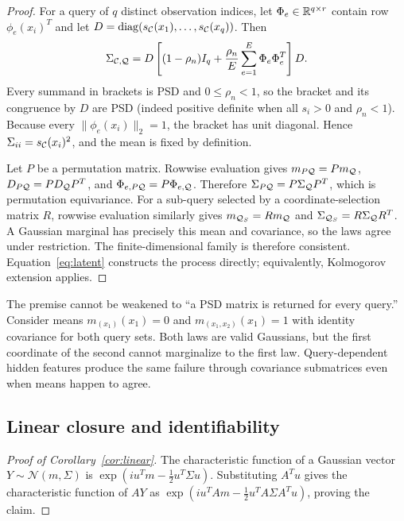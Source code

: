 \begin{proof}
For a query of $q$ distinct observation indices, let
$\Phi_e\in\mathbb{R}^{q\times r}$ contain row $\phi_e(x_i)^T$ and let
$D=\operatorname{diag}(s_{\mathcal{C}}(x_1),\ldots,s_{\mathcal{C}}(x_q))$.
Then
\begin{equation}
 \Sigma_{\mathcal{C},\mathcal{Q}}
 =D\left[(1-\rho_n)I_q+\frac{\rho_n}{E}
              \sum_{e=1}^E\Phi_e\Phi_e^T\right]D.             \label{eq:matrixcov}
\end{equation}
Every summand in brackets is PSD and $0\leq\rho_n<1$, so the bracket
and its congruence by $D$ are PSD (indeed positive definite when all $s_i>0$
and $\rho_n<1$).  Because every $\|\phi_e(x_i)\|_2=1$, the bracket has unit
diagonal.  Hence $\Sigma_{ii}=s_{\mathcal{C}}(x_i)^2$, and the mean is fixed by
definition.

Let $P$ be a permutation matrix.  Rowwise evaluation gives
$m_{P\mathcal{Q}}=Pm_{\mathcal{Q}}$, $D_{P\mathcal{Q}}=PD_{\mathcal{Q}} P^T$, and
$\Phi_{e,P\mathcal{Q}}=P\Phi_{e,\mathcal{Q}}$.  Therefore
$\Sigma_{P\mathcal{Q}}=P\Sigma_{\mathcal{Q}} P^T$, which is permutation equivariance.
For a sub-query selected by a coordinate-selection matrix $R$, rowwise
evaluation similarly gives $m_{\mathcal{Q}_S}=Rm_{\mathcal{Q}}$ and
$\Sigma_{\mathcal{Q}_S}=R\Sigma_{\mathcal{Q}} R^T$.  A Gaussian marginal has precisely
this mean and covariance, so the laws agree under restriction.  The
finite-dimensional family is therefore consistent.  Equation~\eqref{eq:latent}
constructs the process directly; equivalently, Kolmogorov extension applies.
\end{proof}

The premise cannot be weakened to ``a PSD matrix is returned for every
query.''  Consider means $m_{(x_1)}(x_1)=0$ and
$m_{(x_1,x_2)}(x_1)=1$ with identity covariance for both query sets.  Both
laws are valid Gaussians, but the first coordinate of the second cannot
marginalize to the first law.  Query-dependent hidden features produce the
same failure through covariance submatrices even when means happen to agree.

\subsection{Linear closure and identifiability}

\begin{proof}[Proof of Corollary~\ref{cor:linear}]
The characteristic function of a Gaussian vector $Y\sim\mathcal N(m,\Sigma)$
is $\exp(iu^Tm-\tfrac12u^T\Sigma u)$.  Substituting $A^Tu$ gives the
characteristic function of $AY$ as
$\exp(iu^TAm-\tfrac12u^TA\Sigma A^Tu)$, proving the claim.
\end{proof}

